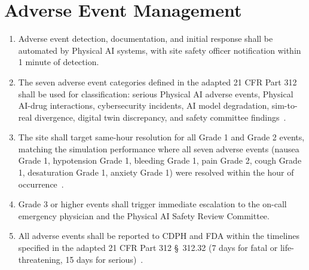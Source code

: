 \documentclass[11pt,letterpaper]{article}
\begin{document}
\section{Adverse Event Management}

\begin{enumerate}[label=(\alph*)]
\item Adverse event detection, documentation, and initial response shall be
  automated by Physical AI systems, with site safety officer notification
  within 1 minute of detection.

\item The seven adverse event categories defined in the adapted 21 CFR Part 312
  shall be used for classification: serious Physical AI adverse events,
  Physical AI-drug interactions, cybersecurity incidents, AI model degradation,
  sim-to-real divergence, digital twin discrepancy, and safety committee
  findings~\cite{cfr312adapt}.

\item The site shall target same-hour resolution for all Grade 1 and Grade 2
  events, matching the simulation performance where all seven adverse events
  (nausea Grade 1, hypotension Grade 1, bleeding Grade 1, pain Grade 2,
  cough Grade 1, desaturation Grade 1, anxiety Grade 1) were resolved within
  the hour of occurrence~\cite{newtrial2026}.

\item Grade 3 or higher events shall trigger immediate escalation to the
  on-call emergency physician and the Physical AI Safety Review Committee.

\item All adverse events shall be reported to CDPH and FDA within the timelines
  specified in the adapted 21 CFR Part 312 \S~312.32 (7 days for fatal or
  life-threatening, 15 days for serious)~\cite{cfr312adapt}.
\end{enumerate}

\printbibliography[title={References}]
\end{document}
